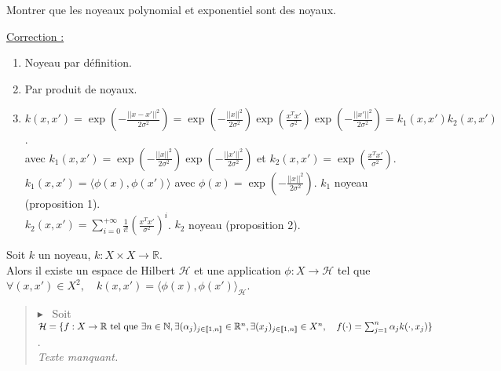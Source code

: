 \documentclass[12pt,a4paper]{article}
\newcommand{\theoreme}[2]{%
    \begin{tcolorbox}[colback=white,colframe=red!25!white,title=\textbf{Théorème #1}, coltitle=black]
        #2
    \end{tcolorbox}
}
\newcommand{\preuve}[1]{%
    \begin{quote}
        $\blacktriangleright$~#1
    \end{quote}
}
\begin{document}
Montrer que les noyeaux polynomial et exponentiel sont des noyaux. \\

\color{blue}

\underline{Correction :}

\begin{enumerate}
    \item Noyeau par définition.
    \item Par produit de noyaux.
    \item $k(x, x') = \exp(-\frac{||x - x'||^2}{2\sigma^2}) = \exp(-\frac{||x||^2}{2\sigma^2}) \exp(\frac{x^T x'}{\sigma^2}) \exp(-\frac{||x'||^2}{2\sigma^2}) = k_1(x, x') k_2(x, x')$. \\
    avec $k_1(x, x') = \exp(-\frac{||x||^2}{2\sigma^2}) \exp(-\frac{||x'||^2}{2\sigma^2})$ et $k_2(x, x') = \exp(\frac{x^T x'}{\sigma^2})$. \\

    $k_1(x, x') = \langle \phi(x), \phi(x') \rangle$ avec $\phi(x) = \exp(-\frac{||x||^2}{2\sigma^2})$. $k_1$ noyeau (proposition 1). \\
    $k_2(x, x') = \sum_{i=0}^{+\infty} \frac{1}{i!} \left(\frac{x^T x'}{\sigma^2}\right)^i$. $k_2$ noyeau (proposition 2).
\end{enumerate}

\color{black}


\theoreme{de Moore-Aronszajn}{
    Soit $k$ un noyeau, $k : X \times X \longrightarrow \mathbb{R}$. \\
    Alors il existe un espace de Hilbert $\mathcal{H}$ et une application $\phi : X \longrightarrow \mathcal{H}$ tel que $\forall (x, x') \in X^2, \quad k(x, x') = \langle \phi(x), \phi(x') \rangle_{\mathcal{H}}$.
}


\preuve{
    Soit $\mathcal{H} = \{f : X \rightarrow \mathbb{R} \text{ tel que } \exists n \in \mathbb{N}, \exists (\alpha_j)_{j \in \llbracket 1, n \rrbracket} \in \mathbb{R}^n, \\
    \exists (x_j)_{j \in \llbracket 1, n \rrbracket} \in X^n, \quad f(\cdot) = \sum_{j=1}^n \alpha_j k(\cdot, x_j)\}$. \\


    \textit{Texte manquant.}
}
\end{document}
